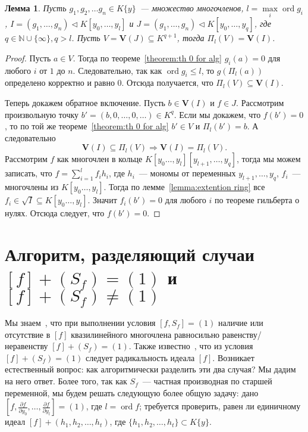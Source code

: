 \documentclass[16pt]{article}
\DeclareMathOperator{\ord}{ord}
\renewcommand{\le}{\leqslant} %
\theoremstyle{plain1}
\newtheorem{lemma}[theorem1]{Лемма}
\theoremstyle{plain2}
\theoremstyle{plain}
\theoremstyle{plain3}
\theoremstyle{definition}
\theoremstyle{remark}
\begin{document}
\begin{lemma} \label{lemma:o proekcii}
Пусть $g_1,g_2,\ldots g_n\in K\{y\}$~--- множество многочленов,
$l=\max\limits_i\ord g_i$,
$I =(g_1,\ldots,g_n) \triangleleft K[y_0,\ldots,y_l]$ и $J =(g_1,\ldots,g_n) \triangleleft K[y_0,\ldots,y_q]$, где
$q\in \mathbb{N}\cup\{\infty\},q> l$. Пусть
$V=\mathbf{V}(J)\subseteq K^{q+1}$,
тогда $\Pi_l(V)=\mathbf{V}(I)$.
\end{lemma}

\begin{proof}

Пусть $a\in V$.
Тогда по теореме~\ref{theorem:th 0 for alg} $g_i(a)=0$ для любого $i$ от $1$ до $n$. Следовательно, так как $\ord g_i \le l$, то $g(\Pi_l(a))$ определено корректно и равно 0. Отсюда получается, что $\Pi_l(V)\subseteq\mathbf{V} (I)$.


Теперь  докажем обратное включение. Пусть $b\in \mathbf{V} (I)$  и $f\in J$. 
Рассмотрим произвольную точку $b'=(b,0,\ldots,0,\ldots)\in K^{q}$. Если мы докажем, что $f(b')=0$, то по той же теореме~\ref{theorem:th 0 for alg}  $b'\in V$ и $\Pi_l(b')=b$. А следовательно $$ \mathbf{V}(I)\subseteq\Pi_l(V)\Rightarrow \mathbf{V}(I)=\Pi_l(V).$$
Рассмотрим $f$  как многочлен в кольце $K[y_0\ldots,y_l][y_{l+1},\ldots,y_q]$, тогда мы можем записать, что $f=\sum\limits_{i=1}^lf_ih_i$, где $h_i$~--- мономы от переменных $y_{l+1},\ldots,y_q$, $f_i$~--- многочлены из $K[y_0\ldots,y_l]$. Тогда по лемме~\ref{lemma:extention ring} все $f_i\in \sqrt{I}\subseteq K[y_0\ldots,y_l]$. Значит $f_i(b')=0$ для любого $i$ по теореме гильберта о нулях. Отсюда следует, что $f(b')=0$.

\end{proof}


\section{Алгоритм, разделяющий случаи $[f]+(S_f)=(1)$ и $[f]+(S_f)\neq(1)$}

Мы знаем~\cite{Trushin}, что при выполнении условия $[f,S_f]=(1)$ наличие или отсутствие в $[f]$ квазилинейного многочлена равносильно равенству/неравенству $[f]+(S_f)=(1)$.
Также известно~\cite{E. R. Kolchin}, что из условия $[f]+(S_f)=(1)$ следует радикальность идеала $[f]$.
Возникает естественный вопрос: как алгоритмически разделить эти два случая?
Мы дадим на него ответ. Более того, так как $S_f$~--- частная производная по старшей переменной, мы будем решать следующую более общую задачу: дано $[f,\frac{\partial f}{\partial y_0},\ldots, \frac{\partial f}{\partial y_l}]=(1)$, где $l=\ord f$; требуется проверить, равен ли единичному идеал $[f]+(h_1,h_2,\ldots,h_t)$, где $\{h_1,h_2,\ldots,h_t\}\subset K\{y\}$.
\end{document}
